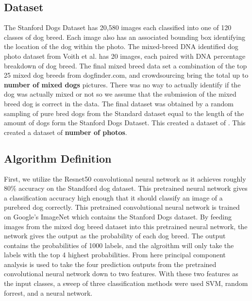 \documentclass[12pt]{article}
\begin{document}
\subsection{Dataset}

The Stanford Dogs Dataset has 20,580 images each classified into one of 120 classes of dog breed. \cite{khosla2011novel} Each image also has an associated bounding box identifying the location of the dog within the photo. The mixed-breed DNA identified dog photo dataset from Voith et al. \cite{voith2009comparison} has 20 images, each paired with DNA percentage breakdown of dog breed. The final mixed breed data set a combination of the top 25 mixed dog breeds from dogfinder.com, and crowdsourcing bring the total up to \textbf{number of mixed dogs} pictures. There was no way to actually identify if the dog was actually mixed or not so we assume that the submission of the mixed breed dog is correct in the data.  The final dataset was obtained by a random sampling of pure bred dogs from the Standard dataset equal to the length of the amount of dogs form the Stanford Dogs Dataset.  This created a dataset of . This created a dataset of \textbf{number of photos}.
\subsection{Algorithm Definition}

First, we utilize the Resnet50 convolutional neural network \cite{he2015deep} as it achieves roughly 80\% accuracy on the Standford dog dataset. This pretrained neural network gives a classification accuracy high enough that it should classify an image of a purebred dog correctly.  This pretrained convolutional neural network is trained on Google's ImageNet which contains the Stanford Dogs dataset. By feeding images from the mixed dog breed dataset into this pretrained neural network, the network gives the output as the probability of each dog breed. The output contains the probabilities of 1000 labels, and the algroithm will only take the labels with the top 4 highest probabilities. From here principal component analysis is used to take the four prediction outputs from the pretrained convolutional neural network down to two features.  With these two features as the input classes, a sweep of three classification methods were used SVM, random forrest, and a neural network.
\end{document}
